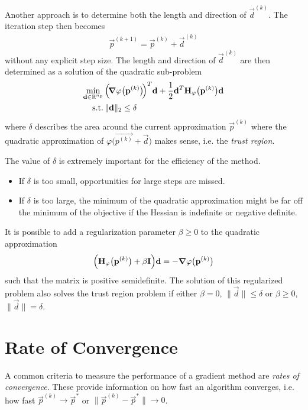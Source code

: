 		Another approach is to determine both the length and direction of \( \vec{d}^{(k)} \). The iteration step then becomes
		\begin{align*}
			\vec{p}^{(k + 1)} = \vec{p}^{(k)} + \vec{d}^{(k)}
		\end{align*}
		without any explicit step size. The length and direction of \( \vec{d}^{(k)} \) are then determined as a solution of the quadratic sub-problem
		\begin{align*}
			\min_{\boldsymbol{\mathrm{d}} \in \mathbb{R}^{n_p}} &\, \Big(\! \grad{\varphi}\big(\boldsymbol{\mathrm{p}}^{(k)}\big) \!\Big)^T \boldsymbol{\mathrm{d}} + \frac{1}{2} \boldsymbol{\mathrm{d}}^T \boldsymbol{\mathrm{H}}_\varphi\big(\boldsymbol{\mathrm{p}}^{(k)}\big) \boldsymbol{\mathrm{d}} \\
			\mathrm{s.t.} &\,
				\begin{alignedat}{2}
					\lVert \boldsymbol{\mathrm{d}} \rVert_2 & \leq \delta
				\end{alignedat}
		\end{align*}
		where \(\delta\) describes the area around the current approximation \( \vec{p}^{(k)} \) where the quadratic approximation of \( \varphi\big(\vec{p^{(k)}} + \vec{d}\big) \) makes sense, i.e. the \emph{trust region}.
		
		The value of \(\delta\) is extremely important for the efficiency of the method.
		\begin{itemize}
			\item If \(\delta\) is too small, opportunities for large steps are missed.
			\item If \(\delta\) is too large, the minimum of the quadratic approximation might be far off the minimum of the objective if the Hessian is indefinite or negative definite.
		\end{itemize}
		It is possible to add a regularization parameter \(\beta \geq 0\) to the quadratic approximation
		\begin{align*}
			\Big( \boldsymbol{\mathrm{H}}_\varphi\big(\boldsymbol{\mathrm{p}}^{(k)}\big) + \beta \boldsymbol{\mathrm{I}} \Big) \boldsymbol{\mathrm{d}} = -\grad{\varphi}\big(\boldsymbol{\mathrm{p}}^{(k)}\big)
		\end{align*}
		such that the matrix is positive semidefinite. The solution of this regularized problem also solves the trust region problem if either \( \beta = 0 \), \( \lVert \vec{d} \rVert \leq \delta \) or \( \beta \geq 0 \), \( \lVert \vec{d} \rVert = \delta \).

	\section{Rate of Convergence}
		A common criteria to measure the performance of a gradient method are \emph{rates of convergence}. These provide information on how fast an algorithm converges, i.e. how fast \( \vec{p}^{(k)} \to \vec{p}^\ast \) or \( \big\lVert \vec{p}^{(k)} - \vec{p}^\ast \big\rVert \to 0 \).
		
